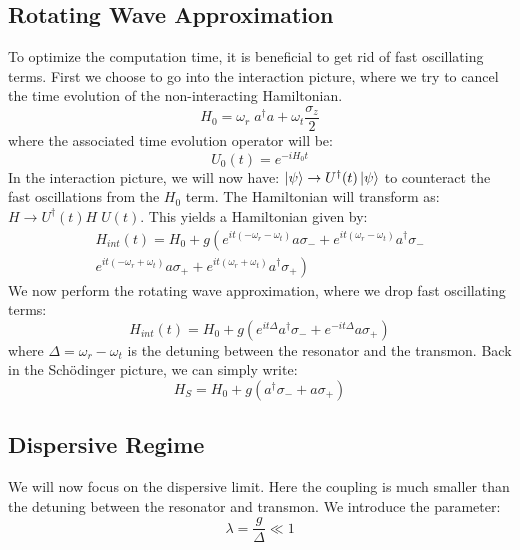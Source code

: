 \subsection{Rotating Wave Approximation} 
To optimize the computation time, it is beneficial to get rid of fast oscillating terms. First we choose to go into the interaction picture, where we try to cancel the time evolution of the non-interacting Hamiltonian.
\begin{equation}
    H_0 = \omega_r \; a^\dagger a + \omega_t\frac{\sigma_z}{2} 
\end{equation}
where the associated time evolution operator will be:
\begin{equation}
    U_0(t) = e^{-iH_0t}
\end{equation}
In the interaction picture, we will now have: $\ket{\psi} \rightarrow U^\dagger(t)\ket{\psi}$ to counteract the fast oscillations from the $H_0$ term. The Hamiltonian will transform as: $H \rightarrow U^\dagger(t) H \; U(t)$. This yields a Hamiltonian given by:
\begin{align*}
    H_{int}(t) = H_0 + g \left(e^{it(-\omega_r - \omega_t)} a \sigma_- + e^{it(\omega_r - \omega_t)} a^\dagger \sigma_-\right.  \\ 
    \left.e^{it(-\omega_r + \omega_t)} a \sigma_+ + e^{it(\omega_r + \omega_t)} a^\dagger \sigma_+\right)
\end{align*}
We now perform the rotating wave approximation, where we drop fast oscillating terms:
\begin{equation}
    H_{int}(t) = H_0 + g \left(e^{it\Delta}a^\dagger\sigma_- +  e^{-it\Delta}a\sigma_+\right)
\end{equation}
where $\Delta = \omega_r - \omega_t$ is the detuning between the resonator and the transmon. Back in the Schödinger picture, we can simply write:
\begin{equation}
    H_{S} = H_0 + g \left(a^\dagger\sigma_- +  a\sigma_+\right)
\end{equation}

\subsection{Dispersive Regime}
We will now focus on the dispersive limit. Here the coupling is much smaller than the detuning between the resonator and transmon. We introduce the parameter:
\begin{equation}
    \lambda = \frac{g}{\Delta} \ll 1
\end{equation}


